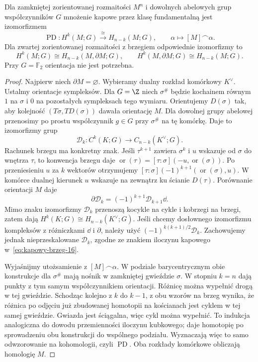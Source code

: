 \begin{twierdzenie}
\label{thm:poincare-dualnosc-16}
Dla zamkniętej zorientowanej
rozmaitości $M^n$ i dowolnych
abelowych grup współczynników $G$ mnożenie
kapowe przez klasę fundamentalną
jest izomorfizmem
\[
 \operatorname{PD}:H^k(M;G)
       \stackrel{\cong}{\longrightarrow}
       H_{n-k}(M;G),\qquad
 \alpha\longmapsto[M]\frown\alpha.
\]
Dla zwartej zorientowanej
rozmaitości z brzegiem
odpowiednie izomorfizmy to
\[
 H^k(M;G)\cong H_{n-k}(M,\partial M;G),
 \qquad
 H^k(M,\partial M;G)\cong H_{n-k}(M;G).
\]
Przy $G=\mathbb F_2$ orientacja
nie jest potrzebna.
\end{twierdzenie}
\begin{proof}
Najpierw niech $\partial M=\varnothing$.
Wybieramy dualny rozkład komórkowy
$K^\vee$. Ustalmy orientacje sympleksów. Dla $G=\Z$ niech
$\sigma^\#$ będzie kochainem równym $1$ na $\sigma$
i $0$ na pozostałych sympleksach tego wymiaru.
Orientujemy $D(\sigma)$ tak, aby kolejność
$(T\sigma,TD(\sigma))$ dawała orientację $M$.
Dla dowolnej grupy abelowej przenosimy po prostu
współczynnik $g\in G$ przy $\sigma^\#$ na tę komórkę.
Daje to izomorfizmy grup
\[
 \mathcal D_k:C^k(K;G)\longrightarrow C_{n-k}(K^\vee;G).
\]
Rachunek brzegu ma konkretny znak. Jeśli $\tau^{k+1}$
zawiera $\sigma^k$ i $u$ wskazuje od $\sigma$ do wnętrza
$\tau$, to konwencja brzegu daje
$\operatorname{or}(\tau)=[\tau:\sigma](-u,\operatorname{or}(\sigma))$.
Po przeniesieniu $u$ za $k$ wektorów otrzymujemy
$[\tau:\sigma](-1)^{k+1}(\operatorname{or}(\sigma),u)$.
W komórce dualnej kierunek $u$ wskazuje na zewnątrz
ku ścianie $D(\tau)$. Porównanie orientacji $M$ daje
\begin{equation}\label{eq:dualny-lancuch-16}
 \partial\mathcal D_k=(-1)^{k+1}\mathcal D_{k+1}\dd.
\end{equation}
Mimo znaku izomorfizmy $\mathcal D_k$ przenoszą
kocykle na cykle i kobrzegi na brzegi, zatem dają
$H^k(K;G)\cong H_{n-k}(K^\vee;G)$.
Jeśli chcemy dosłownego izomorfizmu kompleksów
z różniczkami $\dd$ i $\partial$, należy użyć
$(-1)^{k(k+1)/2}\mathcal D_k$. Zachowujemy jednak
nieprzeskalowane $\mathcal D_k$, zgodne ze znakiem
iloczynu kapowego w~\eqref{eq:kapowy-brzeg-16}.

Wyjaśnijmy utożsamienie z $[M]\frown\alpha$.
W podziale barycentrycznym obie konstrukcje dla
$\sigma^\#$ mają nośnik w zamkniętej gwieździe $\sigma$.
W stopniu $k=n$ dają punkty z tym samym współczynnikiem
orientacji. Różnicę można wypełnić drogą w tej gwieździe.
Schodząc kolejno z $k$ do $k-1$, z obu wzorów na brzeg
wynika, że różnica po odjęciu już zbudowanej homotopii
na kościanach jest cyklem w tej samej gwieździe.
Gwiazda jest ściągalna, więc cykl można wypełnić.
To indukcja analogiczna do dowodu przemienności
iloczynu kubkowego; daje homotopię po sprowadzeniu
obu konstrukcji do wspólnego podziału. Wyznaczają
więc to samo odwzorowanie na kohomologii, czyli $\operatorname{PD}$.
Oba rozkłady komórkowe obliczają homologię $M$.


\end{proof}
